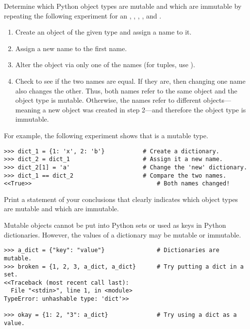 \begin{problem} %
Determine which Python object types are mutable and which are immutable by repeating the following experiment for an , , , , and .
\begin{enumerate}
    \item Create an object of the given type and assign a name to it.
    \item Assign a new name to the first name.
    \item Alter the object via only one of the names (for tuples, use ).
    \item Check to see if the two names are equal.
    If they are, then changing one name also changes the other. 
    Thus, both names refer to the same object and the object type is mutable.
    Otherwise, the names refer to different objects---meaning a new object was created in step 2---and therefore the object type is immutable.
\end{enumerate}
For example, the following experiment shows that  is a mutable type.
\begin{lstlisting}
>>> dict_1 = {1: 'x', 2: 'b'}           # Create a dictionary.
>>> dict_2 = dict_1                     # Assign it a new name.
>>> dict_2[1] = 'a'                     # Change the 'new' dictionary.
>>> dict_1 == dict_2                    # Compare the two names.
<<True>>                                    # Both names changed!
\end{lstlisting}
Print a statement of your conclusions that clearly indicates which object types are mutable and which are immutable.
\end{problem}

\begin{warn} %
Mutable objects cannot be put into Python sets or used as keys in Python dictionaries.
However, the values of a dictionary may be mutable or immutable.
\begin{lstlisting}
>>> a_dict = {"key": "value"}               # Dictionaries are mutable.
>>> broken = {1, 2, 3, a_dict, a_dict}      # Try putting a dict in a set.
<<Traceback (most recent call last):
  File "<stdin>", line 1, in <module>
TypeError: unhashable type: 'dict'>>

>>> okay = {1: 2, "3": a_dict}              # Try using a dict as a value.
\end{lstlisting}
\end{warn}

